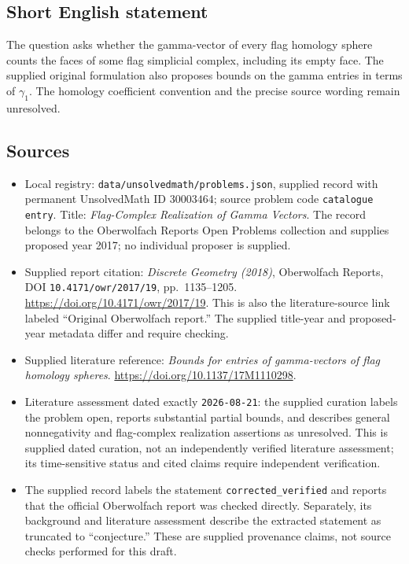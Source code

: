 \documentclass[11pt]{article}
\begin{document}
\subsection{Short English statement}
The question asks whether the gamma-vector of every flag homology sphere counts the faces of some flag simplicial complex, including its empty face. The supplied original formulation also proposes bounds on the gamma entries in terms of \(\gamma_1\). The homology coefficient convention and the precise source wording remain unresolved.
\subsection{Sources}
\begin{itemize}
\item Local registry: \texttt{data/unsolvedmath/problems.json}, supplied record with permanent UnsolvedMath ID \(30003464\); source problem code \texttt{catalogue entry}. Title: \emph{Flag-Complex Realization of Gamma Vectors}. The record belongs to the Oberwolfach Reports Open Problems collection and supplies proposed year 2017; no individual proposer is supplied.
\item Supplied report citation: \emph{Discrete Geometry (2018)}, Oberwolfach Reports, DOI \texttt{10.4171/owr/2017/19}, pp.~1135--1205. \url{https://doi.org/10.4171/owr/2017/19}. This is also the literature-source link labeled ``Original Oberwolfach report.'' The supplied title-year and proposed-year metadata differ and require checking.
\item Supplied literature reference: \emph{Bounds for entries of gamma-vectors of flag homology spheres}. \url{https://doi.org/10.1137/17M1110298}.
\item Literature assessment dated exactly \texttt{2026-08-21}: the supplied curation labels the problem open, reports substantial partial bounds, and describes general nonnegativity and flag-complex realization assertions as unresolved. This is supplied dated curation, not an independently verified literature assessment; its time-sensitive status and cited claims require independent verification.
\item The supplied record labels the statement \texttt{corrected\_verified} and reports that the official Oberwolfach report was checked directly. Separately, its background and literature assessment describe the extracted statement as truncated to ``conjecture.'' These are supplied provenance claims, not source checks performed for this draft.
\end{itemize}
\end{document}
